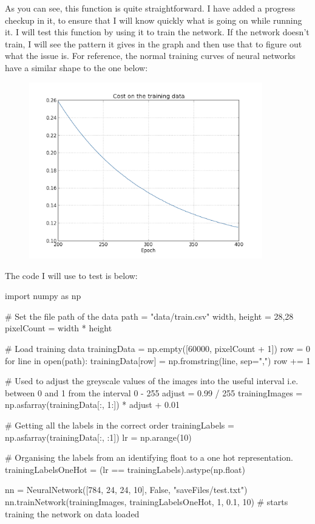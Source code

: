 \documentclass{report}
\begin{document}
As you can see, this function is quite straightforward. I have added a progress checkup in it, to ensure that I will know quickly what is going on while running it. I will test this function by using it to train the network. If the network doesn't train, I will see the pattern it gives in the graph and then use that to figure out what the issue is. For reference, the normal training curves of neural networks have a similar shape to the one below:
\begin{figure}[H]
    \centering
    \includegraphics[width = 4in]{Images/Development and Testing/Stage 3/Example Training Curve.png} 
    \label{fig:Example Cost Graph}
\end{figure}
\noindent The code I will use to test is below:
\begin{python}
import numpy as np

# Set the file path of the data
path = "data/train.csv"
width, height = 28,28
pixelCount = width * height

# Load training data
trainingData = np.empty([60000, pixelCount + 1])
row = 0
for line in open(path):
    trainingData[row] = np.fromstring(line, sep=",")
    row += 1

# Used to adjust the greyscale values of the images into the useful interval i.e. between 0 and 1 from the interval 0 - 255
adjust = 0.99 / 255
trainingImages = np.asfarray(trainingData[:, 1:]) * adjust + 0.01

# Getting all the labels in the correct order
trainingLabels = np.asfarray(trainingData[:, :1])
lr = np.arange(10)

# Organising the labels from an identifying float to a one hot representation.
trainingLabelsOneHot = (lr == trainingLabels).astype(np.float)

nn = NeuralNetwork([784, 24, 24, 10], False, "saveFiles/test.txt")
nn.trainNetwork(trainingImages, trainingLabelsOneHot, 1, 0.1, 10)  # starts training the network on data loaded
\end{python}
\end{document}
